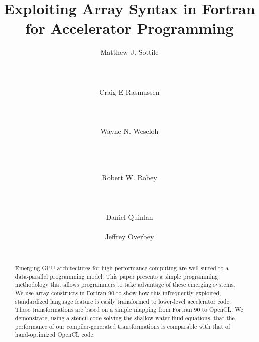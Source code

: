 \documentclass{acm_proc_article-sp}
\begin{document}
\title{Exploiting Array Syntax in Fortran for Accelerator Programming}


\author{
\alignauthor
Matthew J. Sottile\\
       \\
       \\
       \\
\alignauthor
Craig E Rasmussen\\
       \\
       \\
       \\
\alignauthor
Wayne N. Weseloh\\
       \\
       \\
       \\
\and  %
\alignauthor
Robert W. Robey\\
       \\
       \\
       \\
\alignauthor
Daniel Quinlan\\
       \\
\alignauthor
Jeffrey Overbey\\
       \\
}

\maketitle

\begin{abstract}
Emerging GPU architectures for high performance computing are well suited to a
data-parallel programming model.  This paper presents a simple programming
methodology that allows programmers to take advantage of these emerging systems.
We use array constructs in Fortran 90 to show how this infrequently exploited,
standardized language feature is easily transformed to lower-level accelerator
code.  These transformations are based on a simple mapping from Fortran 90 to
OpenCL.  We demonstrate, using a stencil code solving the shallow-water fluid
equations, that the performance of our compiler-generated transformations is
comparable with that of hand-optimized OpenCL code.
\end{abstract}
\end{document}
